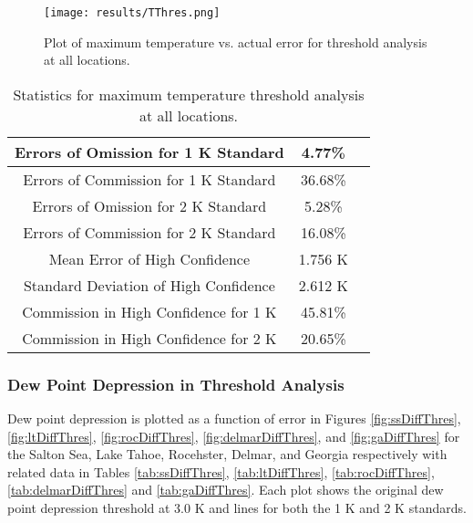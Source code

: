 \documentclass{book}
\begin{document}
\begin{minipage}[c]{0.47\textwidth}
\centering
\begin{figure}[H]
\texttt{[image: results/TThres.png]}
\caption{Plot of maximum temperature vs. actual error for threshold analysis at all locations.}
\label{fig:TThres}
\end{figure}
\end{minipage}
\begin{minipage}[c]{0.47\textwidth}
\begin{table}[H]
\centering
\footnotesize
\begin{tabular}{ | c | c | c | } \hline
Errors of Omission for 1 K Standard & 4.77\% \\ \hline
Errors of Commission for 1 K Standard & 36.68\% \\ \hline
Errors of Omission for 2 K Standard & 5.28\% \\ \hline
Errors of Commission for 2 K Standard & 16.08\% \\ \hline
Mean Error of High Confidence & 1.756 K \\ \hline
Standard Deviation of High Confidence & 2.612 K \\ \hline
Commission in High Confidence for 1 K & 45.81\% \\ \hline
Commission in High Confidence for 2 K & 20.65\% \\ \hline
\end{tabular}
\caption{Statistics for maximum temperature threshold analysis at all locations.}
\label{tab:TThres}
\end{table}
\end{minipage}

\subsubsection{Dew Point Depression in Threshold Analysis}

Dew point depression is plotted as a function of error in Figures \ref{fig:ssDiffThres}, \ref{fig:ltDiffThres}, \ref{fig:rocDiffThres}, \ref{fig:delmarDiffThres}, and \ref{fig:gaDiffThres} for the Salton Sea, Lake Tahoe, Rocehster, Delmar, and Georgia respectively with related data in Tables \ref{tab:ssDiffThres}, \ref{tab:ltDiffThres}, \ref{tab:rocDiffThres}, \ref{tab:delmarDiffThres} and \ref{tab:gaDiffThres}.  Each plot shows the original dew point depression threshold at 3.0 K and lines for both the 1 K and 2 K standards.
\end{document}
